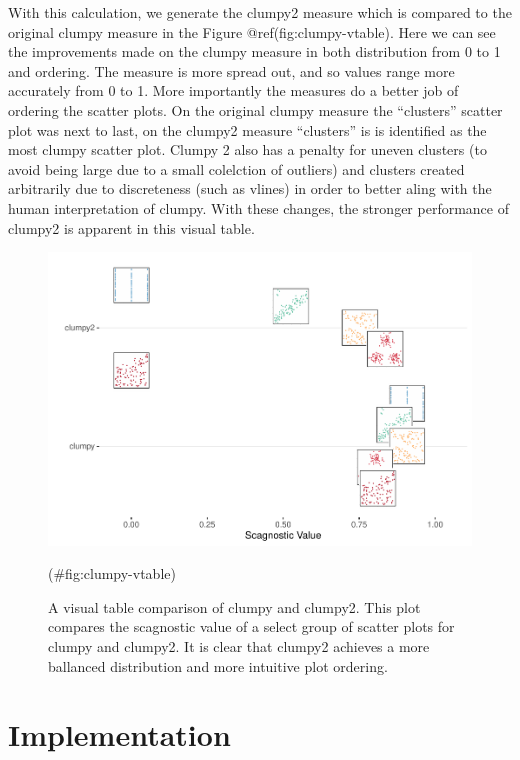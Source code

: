 With this calculation, we generate the clumpy2 measure which is compared
to the original clumpy measure in the Figure @ref(fig:clumpy-vtable).
Here we can see the improvements made on the clumpy measure in both
distribution from 0 to 1 and ordering. The measure is more spread out,
and so values range more accurately from 0 to 1. More importantly the
measures do a better job of ordering the scatter plots. On the original
clumpy measure the ``clusters'' scatter plot was next to last, on the
clumpy2 measure ``clusters'' is is identified as the most clumpy scatter
plot. Clumpy 2 also has a penalty for uneven clusters (to avoid being
large due to a small colelction of outliers) and clusters created
arbitrarily due to discreteness (such as vlines) in order to better
aling with the human interpretation of clumpy. With these changes, the
stronger performance of clumpy2 is apparent in this visual table.

\begin{Schunk}
\begin{figure}
\includegraphics[width=1\linewidth]{mason-lee-laa-cook_files/figure-latex/clumpy-vtable-1} \caption[A visual table comparison of clumpy and clumpy2]{A visual table comparison of clumpy and clumpy2. This plot compares the scagnostic value of a select group of scatter plots for clumpy and clumpy2. It is clear that clumpy2 achieves a more ballanced distribution and more intuitive plot ordering.}(\#fig:clumpy-vtable)
\end{figure}
\end{Schunk}

\hypertarget{implementation}{%
\section{Implementation}\label{implementation}}

